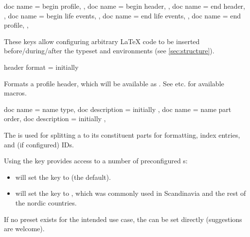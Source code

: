 \documentclass[
	a4paper,
]{article}
\begin{document}
\begin{docKeys}
	[
		doc parameter = {=\meta{...}},
		doc description = {initially not set},
	]
	{
		{
			doc name = begin profile,
		},
		{
			doc name = begin header,
		},
		{
			doc name = end header,
		},
		{
			doc name = begin life events,
		},
		{
			doc name = end life events,
		},
		{
			doc name = end profile,
		},
	}

	These keys allow configuring arbitrary \LaTeX{} code to be inserted before/during/after the typeset  and  environments (see \cref{sec:structure}).

\end{docKeys}

\begin{docKey}
	{header format}
	{=}
	{initially }

	Formats a profile header, which will be available as . See  etc. for available macros.
\end{docKey}

\begin{docKeys}
	[
		doc parameter = {=\meta{...}},
	]
	{
		{
			doc name = name type,
			doc description = {initially }
		},
		{
			doc name = name part order,
			doc description = {initially }
		},
	}

	The  is used for splitting a  to its constituent parts for formatting, index entries, and (if configured) IDs.

	Using the  key provides access to a number of preconfigured s:

	\begin{itemize}
		\item {} will set the  key to  (the default).
		\item {} will set the  key to , which was commonly used in Scandinavia and the rest of the nordic countries.
	\end{itemize}

	If no preset  exists for the intended use case, the  can be set directly (suggestions are welcome).
\end{docKeys}
\end{document}
